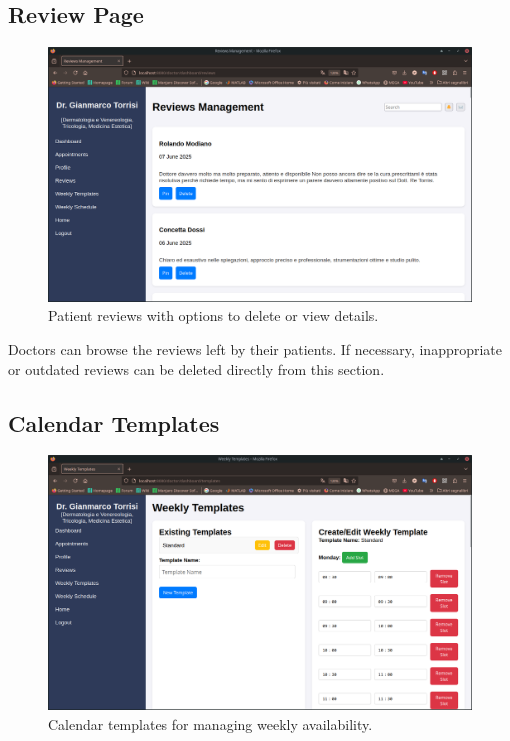 \subsection{Review Page}

\begin{figure}[!h]
    \centering
    \includegraphics[scale=0.30]{resources/screenshots/doctor_ui/reviews.png}
    \caption{Patient reviews with options to delete or view details.}
    \label{fig:patient_reviews}
\end{figure}

Doctors can browse the reviews left by their patients. If necessary, inappropriate or outdated reviews can be deleted directly from this section.

\subsection{Calendar Templates}

\begin{figure}
    \centering
    \includegraphics[scale=0.30]{resources/screenshots/doctor_ui/template.png}
    \caption{Calendar templates for managing weekly availability.}
    \label{fig:calendar_templates}
\end{figure}

